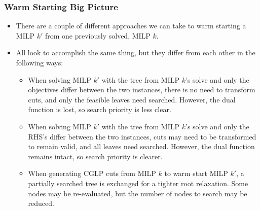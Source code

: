 \documentclass{beamer}
\begin{document}
	\begin{frame}[t]
		\frametitle{Warm Starting Big Picture}
		\small
		\vspace{-.5cm}
		\begin{itemize}
			\item There are a couple of different approaches we can take to warm starting a MILP $ k' $ from one previously solved, MILP $ k $.
			\item All look to accomplish the same thing, but they differ from each other in the following ways:
			\begin{itemize}
				\item When solving MILP $ k' $ with the tree from MILP $ k $'s solve and only the objectives differ between the two instances, there is no need to transform cuts, and only the feasible leaves need searched. However, the dual function is lost, so search priority is less clear.
				\item When solving MILP $ k' $ with the tree from MILP $ k $'s solve and only the RHS's differ between the two instances, cuts may need to be transformed to remain valid, and all leaves need searched. However, the dual function remains intact, so search priority is clearer.
				\item When generating CGLP cuts from MILP $ k $ to warm start MILP $ k' $, a partially searched tree is exchanged for a tighter root relaxation. Some nodes may be re-evaluated, but the number of nodes to search may be reduced.
			\end{itemize}
		\end{itemize}
		\normalsize
	\end{frame}
\end{document}
